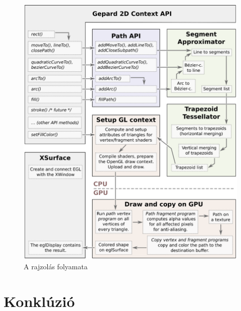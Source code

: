 \documentclass[12pt]{report}
\theoremstyle{definition}
\begin{document}
    \begin{figure}[h]
    \centering
    \includegraphics[scale=0.6]{img/dataflow_eps}
    \caption{\label{dataflow-diagram} A rajzolás folyamata}
    \end{figure}



    \chapter{Konklúzió}



    {}
    
\end{document}
